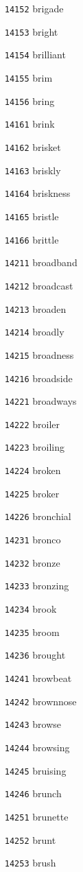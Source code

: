 \documentclass[twoside,11pt]{article}
\begin{document}
\begin{multicols}{5}
\begin{enumerate}
\item[\texttt{14152}] brigade
\item[\texttt{14153}] bright
\item[\texttt{14154}] brilliant
\item[\texttt{14155}] brim
\item[\texttt{14156}] bring
\item[\texttt{14161}] brink
\item[\texttt{14162}] brisket
\item[\texttt{14163}] briskly
\item[\texttt{14164}] briskness
\item[\texttt{14165}] bristle
\item[\texttt{14166}] brittle
\item[\texttt{14211}] broadband
\item[\texttt{14212}] broadcast
\item[\texttt{14213}] broaden
\item[\texttt{14214}] broadly
\item[\texttt{14215}] broadness
\item[\texttt{14216}] broadside
\item[\texttt{14221}] broadways
\item[\texttt{14222}] broiler
\item[\texttt{14223}] broiling
\item[\texttt{14224}] broken
\item[\texttt{14225}] broker
\item[\texttt{14226}] bronchial
\item[\texttt{14231}] bronco
\item[\texttt{14232}] bronze
\item[\texttt{14233}] bronzing
\item[\texttt{14234}] brook
\item[\texttt{14235}] broom
\item[\texttt{14236}] brought
\item[\texttt{14241}] browbeat
\item[\texttt{14242}] brownnose
\item[\texttt{14243}] browse
\item[\texttt{14244}] browsing
\item[\texttt{14245}] bruising
\item[\texttt{14246}] brunch
\item[\texttt{14251}] brunette
\item[\texttt{14252}] brunt
\item[\texttt{14253}] brush

\end{enumerate}
\end{multicols}
\end{document}
